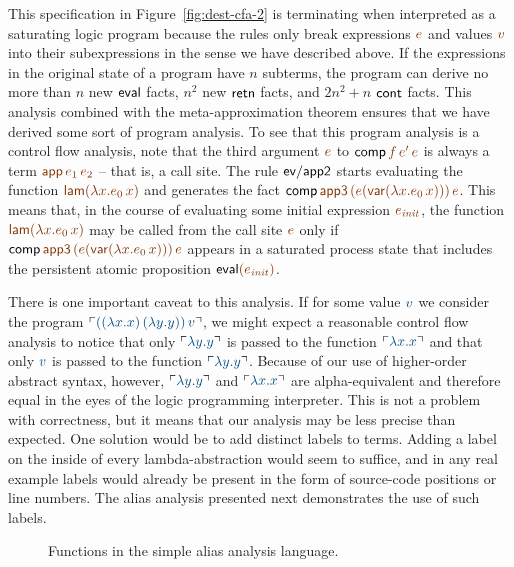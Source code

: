 This specification in Figure~\ref{fig:dest-cfa-2} is terminating when
interpreted as a saturating logic program because the rules only break
expressions $\lf{e}$ and values $\lf{v}$ 
into their subexpressions in the sense
we have described above. If the expressions in the original state of a
program have $n$ subterms, the program can derive no more than $n$ new
${\sf eval}$ facts, $n^2$ new ${\sf retn}$ facts, and $2n^2 + n$ ${\sf
  cont}$ facts. This analysis combined with the meta-approximation
theorem ensures that we have derived some sort of program analysis. To
see that this program analysis is a control flow analysis, note that
the third argument $\lf{e}$ to ${\sf comp}\,\lf{f}\,\lf{e'}\,\lf{e}$ 
is always a term
$\lf{{\sf app}\,e_1\,e_2}$ -- that is, a call site. The rule ${\sf
  ev/app2}$ starts evaluating the function $\lf{{\sf lam}(\lambda
x.e_0\,x)}$ and generates the fact ${\sf comp}\,\lf{\sf app3}\,\lf{(e({\sf
  var}(\lambda x.e_0\,x)))}\,\lf{e}$. This means that, in the course of
evaluating some initial expression $\lf{e_{\it init}}$, the function $\lf{{\sf
  lam}(\lambda x.e_0\,x)}$ may be called from the call site $\lf{e}$ only if
${\sf comp}\,\lf{\sf app3}\,\lf{(e({\sf var}(\lambda x.e_0\,x)))}\,\lf{e}$ appears
in a saturated process state that includes the persistent 
atomic proposition ${\sf eval}\lf{(e_{\it init})}$.

There is one important caveat to this analysis. If for some value $\obj{v}$
we consider the program $\interp{((\lambda x.x)\,(\lambda y.y))\,v}$,
we might expect a reasonable control flow analysis to notice that only
$\interp{\lambda y.y}$ is passed to the function $\interp{\lambda
  x.x}$ and that only $\obj{v}$ is passed to the function $\interp{\lambda
  y.y}$. Because of our use of higher-order abstract syntax, however,
$\interp{\lambda y.y}$ and $\interp{\lambda x.x}$ are alpha-equivalent
and therefore equal in the eyes of the logic programming
interpreter. This is not a problem with correctness, but it means that
our analysis may be less precise than expected. One solution would be
to add distinct labels to terms. Adding a label on the inside of every
lambda-abstraction would seem to suffice, and in any real example
labels would already be present in the form of source-code positions
or line numbers. The alias analysis presented next demonstrates the
use of such labels.

\begin{figure}
\caption{Functions in the simple alias analysis language.}
\label{fig:ssos-monadic}
\end{figure}

